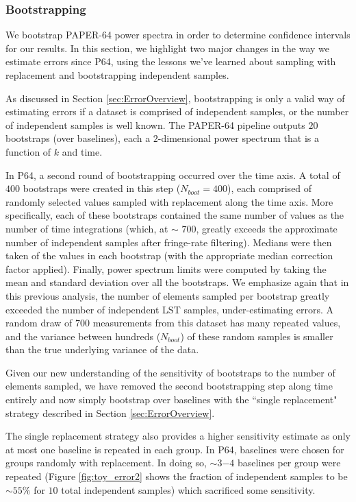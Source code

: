 \documentclass[preprint2,numberedappendix,tighten]{aastex6}  %
\begin{document}
\subsubsection{Bootstrapping}
\label{sec:Boot}

We bootstrap PAPER-64 power spectra in order to determine confidence intervals for our results. In this section, we highlight 
two major changes in the way we estimate errors since P64, using the lessons we've learned about sampling with replacement 
and bootstrapping independent samples.

As discussed in Section \ref{sec:ErrorOverview}, bootstrapping is only a valid way of estimating errors if a dataset is comprised 
of independent samples, or the number of independent samples is well known. The PAPER-64 pipeline outputs $20$ bootstraps (over baselines), each a $2$-dimensional power 
spectrum that is a function of $k$ and time. 

In P64, a second round of bootstrapping occurred over the time axis. A total of $400$ bootstraps were created in this step 
($N_{boot} = 400$), each comprised of randomly selected values sampled with replacement along the time axis. More 
specifically, each of these bootstraps contained the same number of values as the number of time integrations (which, at $\sim$
$700$, greatly exceeds the approximate number of independent samples after fringe-rate filtering).
Medians were then taken of the values in each bootstrap (with the appropriate median correction factor applied). Finally, power 
spectrum limits were computed by taking the mean and standard deviation over all the bootstraps. We emphasize again that in 
this previous analysis, the number of elements sampled per bootstrap greatly 
exceeded the number of independent LST samples, under-estimating errors. A random draw of $700$ 
measurements from this dataset has many repeated values, and the variance between hundreds ($N_{boot}$) of these random 
samples is smaller than the true underlying variance of the data. 

Given our new understanding of the sensitivity of bootstraps to the number of elements sampled, we have removed the second 
bootstrapping step along time entirely and now simply bootstrap over baselines with the ``single replacement" strategy 
described in Section \ref{sec:ErrorOverview}.

The single replacement strategy also provides a higher sensitivity estimate as only at most one baseline is repeated in each 
group. In P64, baselines were chosen for groups randomly with replacement. In doing so, $\sim3$$-4$ baselines per group 
were repeated (Figure \ref{fig:toy_error2} shows the fraction of independent samples to be $\sim$$55\%$ for $10$ total 
independent samples) which sacrificed some sensitivity. 
\end{document}
